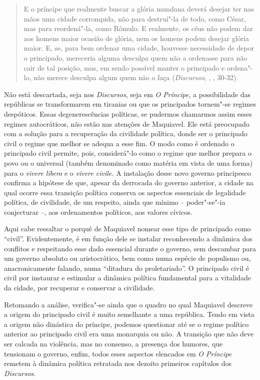 \begin{quote}
E o príncipe que realmente buscar a glória mundana deverá desejar ter
nas mãos uma cidade corrompida, não para destruí"-la de todo, como César,
mas para reordená"-la, como Rômulo. E realmente, os céus não podem dar
aos homens maior ocasião de glória, nem os homens podem desejar glória
maior. E, se, para bem ordenar uma cidade, houvesse necessidade de depor
o principado, mereceria alguma desculpa quem não a ordenasse para não
cair de tal posição, mas, em sendo possível manter o principado e
ordena"-lo, não merece desculpa algum quem não o faça (\emph{Discursos},
, , 30-32).
\end{quote}

Não está descartada, seja nos \emph{Discursos}, seja em \emph{O
Príncipe}, a possibilidade das repúblicas se transformarem em tiranias
ou que os principados tornem"-se regimes despóticos. Essas
degenerescências políticas, se pudermos chamarmos assim esses regimes
autocráticos, não estão nas atenções de Maquiavel. Ele está preocupado
com a solução para a recuperação da civilidade política, donde ser o
principado civil o regime que melhor se adequa a esse fim. O modo como é
ordenado o principado civil permite, pois, considerá"-lo como o regime
que melhor prepara o povo ou o universal (também denominado como matéria
em vista de uma forma) para o \emph{vivere libero} e o \emph{vivere
civile.} A instalação desse novo governo principesco confirma a hipótese
de que, apesar da derrocada do governo anterior, a cidade na qual ocorre
essa transição política conserva os aspectos essenciais de legalidade
política, de civilidade, de um respeito, ainda que mínimo -- poder"-se"-ia
conjecturar --, aos ordenamentos políticos, aos valores cívicos.

Aqui cabe ressaltar o porquê de Maquiavel nomear esse tipo de principado
como ``civil''. Evidentemente, é em função dele se instalar reconhecendo
a dinâmica dos conflitos e respeitando esse dado essencial durante o
governo, sem descambar para um governo absoluto ou aristocrático, bem
como numa espécie de populismo ou, anacronicamente falando, numa
``ditadura do proletariado''. O principado civil é civil por instaurar e
estimular a dinâmica política fundamental para a vitalidade da cidade,
por recuperar e conservar a civilidade.

Retomando a análise, verifica"-se ainda que o quadro no qual Maquiavel
descreve a origem do principado civil é muito semelhante a uma
república. Tendo em vista a origem não dinástica do príncipe, podemos
questionar até se o regime político anterior ao principado civil era uma
monarquia ou não. A transição que não deve ser calcada na violência, mas
no consenso, a presença dos humores, que tensionam o governo, enfim,
todos esses aspectos elencados em \emph{O Príncipe} remetem à dinâmica
política retratada nos dezoito primeiros capítulos dos \emph{Discursos}.

